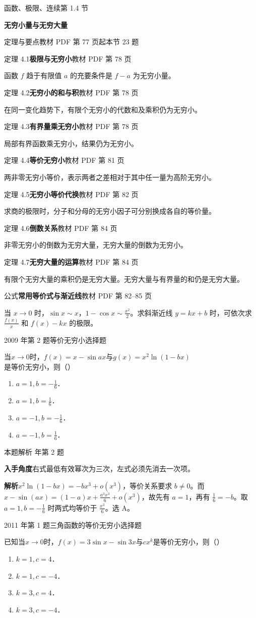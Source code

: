 \documentclass[UTF8,zihao=-4,fontset=fandol]{ctexart}
\newcommand{\SectionHeading}[4]{%
  \clearpage\hypertarget{sec-#1}{}%
  {\small\textcolor{accent}{#2\hfill 第 #1 节}}\par\medskip
  {\LARGE\bfseries #3}\par\smallskip
  {\small\textcolor{muted}{#4}}\par\bigskip}
\newcommand{\Theory}[4]{%
  {\small\textcolor{accent}{#1}\quad\textbf{#3}\hfill\textcolor{muted}{教材 PDF 第 #2 页}}\par
  {\small #4}\par\smallskip}
\newcommand{\pickout}{\hfill（\hspace{1.4em}）}
\newenvironment{abcd}{\begin{enumerate}[label=\textup{(\Alph*)},leftmargin=2.3em,itemsep=1pt,topsep=4pt,parsep=1pt]}{\end{enumerate}}
\newcommand{\QuestionPage}[6]{%
  \par\noindent\begin{minipage}{\linewidth}
  \raggedright
  {\small\textcolor{black!60}{#3\quad #5}\hfill\textcolor{accent}{#2}}\par\smallskip}
\newcommand{\QuestionEnd}{\end{minipage}\par\medskip}
\newcommand{\QuestionPage}[6]{%
  \clearpage
  {\small\textcolor{accent}{#1\hfill #2}}\par\medskip
  {\small\textcolor{black!60}{#3\quad #5\hfill #6}}\par\vspace{9bp}}
\newcommand{\QuestionEnd}{}
\newenvironment{QuestionSolution}[1]{%
  \clearpage
  {\small\textcolor{black!60}{本题解析\quad #1}}\par\medskip
}{\par\clearpage}
\begin{document}
\SectionHeading{1.4}{函数、极限、连续}{无穷小量与无穷大量}{定理与要点\quad 教材 PDF 第 77 页起\hfill 本节 23 题}
\Theory{定理 4.1}{78}{极限与无穷小}{函数 \(f\) 趋于有限值 \(a\) 的充要条件是 \(f-a\) 为无穷小量。}
\Theory{定理 4.2}{78}{无穷小的和与积}{在同一变化趋势下，有限个无穷小的代数和及乘积仍为无穷小。}
\Theory{定理 4.3}{78}{有界量乘无穷小}{局部有界函数乘无穷小，结果仍为无穷小。}
\Theory{定理 4.4}{81}{等价无穷小}{两非零无穷小等价，表示两者之差相对于其中任一量为高阶无穷小。}
\Theory{定理 4.5}{82}{无穷小等价代换}{求商的极限时，分子和分母的无穷小因子可分别换成各自的等价量。}
\Theory{定理 4.6}{84}{倒数关系}{非零无穷小的倒数为无穷大量，无穷大量的倒数为无穷小。}
\Theory{定理 4.7}{84}{无穷大量的运算}{有限个无穷大量的乘积仍是无穷大量。无穷大量与有界量的和仍是无穷大量。}
\Theory{公式}{82--85}{常用等价式与渐近线}{当 \(x\to0\) 时，\(\sin x\sim x\)，\(1-\cos x\sim\frac{x^2}{2}\)。求斜渐近线 \(y=kx+b\) 时，可依次求 \(\frac{f(x)}{x}\) 和 \(f(x)-kx\) 的极限。}
\QuestionPage{1.4 无穷小量与无穷大量}{选择题}{2009 年第 2 题}{1}{等价无穷小}{017 / 234}
当$x \to 0$时，$f(x) = x - \sin ax$与$g(x) = x^2\ln (1 - bx)$是等价无穷小，则\pickout{}
\begin{abcd}
\item $a = 1,b = - \frac{1}{6}$．
\item $a = 1,b = \frac{1}{6}$．
\item $a = - 1,b = - \frac{1}{6}$．
\item $a = - 1,b = \frac{1}{6}$．
\end{abcd}
\QuestionEnd

\begin{QuestionSolution}{2009 年第 2 题}
\textbf{入手角度}\quad 右式最低有效幂次为三次，左式必须先消去一次项。

\textbf{解析}\quad \(x^2\ln(1-bx)=-bx^3+o(x^3)\)，等价关系要求 \(b\ne0\)。而 \(x-\sin(ax)=(1-a)x+\frac{a^3x^3}{6}+o(x^3)\)，故先有 \(a=1\)，再有 \(\frac{1}{6}=-b\)。取 \(a=1,b=-\frac{1}{6}\) 时两式均等价于 \(\frac{x^3}{6}\)。选 A。
\end{QuestionSolution}

\QuestionPage{1.4 无穷小量与无穷大量}{选择题}{2011 年第 1 题}{1}{三角函数的等价无穷小}{018 / 234}
已知当$x \to 0$时，$f(x) = 3\sin x - \sin 3x$与$cx^k$是等价无穷小，则\pickout{}
\begin{abcd}
\item $k = 1,c = 4$．
\item $k = 1,c = - 4$．
\item $k = 3,c = 4$．
\item $k = 3,c = - 4$．
\end{abcd}
\QuestionEnd
\end{document}
